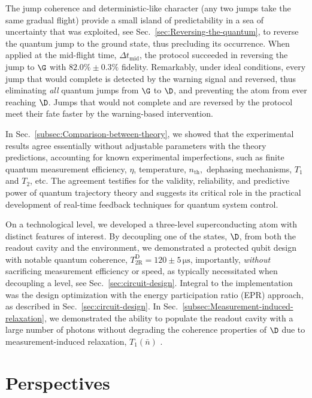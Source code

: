 The jump coherence and deterministic-like character (any two jumps
take the same gradual flight) provide a small island of predictability
in a sea of uncertainty that was exploited, see Sec.~\ref{sec:Reversing-the-quantum},
to reverse the quantum jump to the ground state, thus precluding its
occurrence. When applied at the mid-flight time, $\Delta t_{\mathrm{mid}}$,
the protocol succeeded in reversing the jump to $\G$ with $82.0\%\pm0.3\%$
fidelity. Remarkably, under ideal conditions, every jump that would
complete is detected by the warning signal and reversed, thus eliminating
\emph{all} quantum jumps from $\G$ to $\D$, and preventing the atom
from ever reaching $\D$. Jumps that would not complete and are reversed
by the protocol meet their fate faster by the warning-based intervention.

In Sec.~\ref{subsec:Comparison-between-theory}, we showed that the
experimental results agree essentially without adjustable parameters
with the theory predictions, accounting for known experimental imperfections,
such as finite quantum measurement efficiency, $\eta$, temperature,
$n_{\mathrm{th}},$ dephasing mechanisms, $T_{1}$ and $T_{2}$, etc.
The agreement testifies for the validity, reliability, and predictive
power of quantum trajectory theory and suggests its critical role
in the practical development of real-time feedback techniques for
quantum system control. 

On a technological level, we developed a three-level superconducting
atom with distinct features of interest. By decoupling one of the
states, $\D$, from both the readout cavity and the environment, we
demonstrated a protected qubit design with notable quantum coherence,
$T_{\mathrm{2R}}^{\mathrm{D}}=120\pm5\,\mathrm{\mu s}$, importantly,
\emph{without }sacrificing measurement efficiency or speed, as typically
necessitated when decoupling a level, see Sec.~\ref{sec:circuit-design}.
Integral to the implementation was the design optimization with the
energy participation ratio (EPR) approach, as described in Sec.~\ref{sec:circuit-design}.
In Sec.~\ref{subsec:Measurement-induced-relaxation}, we demonstrated
the ability to populate the readout cavity with a large number of
photons without degrading the coherence properties of $\D$ due to
measurement-induced relaxation, $T_{1}\left(\bar{n}\right)$ . 

 

 


\section{Perspectives}

